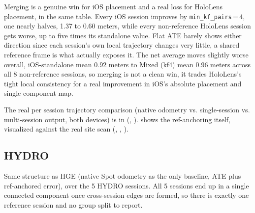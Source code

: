 Merging is a genuine win for iOS placement and a real loss for HoloLens placement, in the same
table. Every iOS session improves by \texttt{min\_kf\_pairs}\,=\,4, one nearly halves, 1.37 to 0.60
meters, while every non-reference HoloLens session gets worse, up to five times its standalone
value. Flat ATE barely shows either direction since each session's own local trajectory changes
very little, a shared reference frame is what actually exposes it. The net average moves slightly
worse overall, iOS-standalone mean 0.92 meters to Mixed (kf4) mean 0.96 meters across all 8
non-reference sessions, so merging is not a clean win, it trades HoloLens's tight local consistency
for a real improvement in iOS's absolute placement and single component map.

The real per session trajectory comparison (native odometry vs. single-session vs. multi-session
output, both devices) is in  (,
).  shows the ref-anchoring
itself, visualized against the real site scan
(, ,
).

\subsection{HYDRO}
\label{sec:experiments-main-hydro}

Same structure as HGE (native Spot odometry as the only baseline, ATE plus ref-anchored error),
over the 5 HYDRO sessions. All 5 sessions end up in a single connected component once
cross-session edges are formed, so there is exactly one reference session and no group split to
report.

